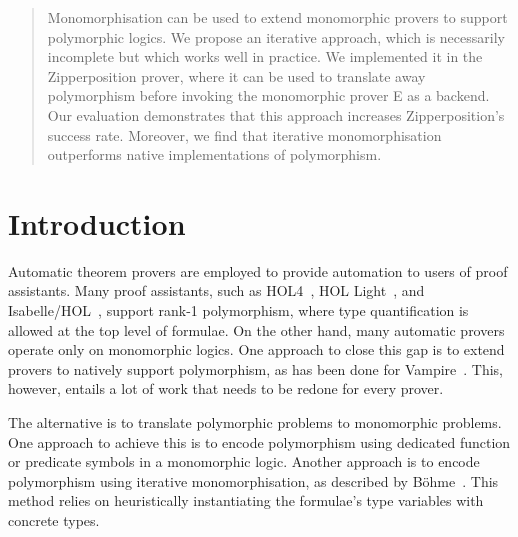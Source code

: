 \documentclass[runningheads]{llncs}
\begin{document}
\author{Tanguy Bozec \and
Jasmin Blanchette}




\maketitle

\begin{sloppy}
\begin{abstract}
Monomorphisation can be used to extend monomorphic provers to support polymorphic logics. We propose an iterative approach, which is necessarily incomplete but which works well in practice. We implemented it in the Zipperposition prover, where it can be used to translate away polymorphism before invoking the monomorphic prover E as a backend. Our evaluation demonstrates that this approach increases Zipperposition's success rate. Moreover, we find that iterative monomorphisation outperforms native implementations of polymorphism.

\end{abstract}
\end{sloppy}

\section{Introduction}

Automatic theorem provers are employed to provide automation to users of proof assistants. Many proof assistants, such as HOL4~\cite{slind-norrish-2008}, HOL Light~\cite{harrison-2009}, and Isabelle/HOL~\cite{nipkow-et-al-2002}, support rank-1 polymorphism, where type quantification is allowed at the top level of formulae. On the other hand, many automatic provers operate only on monomorphic logics. One approach to close this gap is to extend provers to natively support polymorphism, as has been done for Vampire~\cite{bhayat-reger-2020}. This, however, entails a lot of work that needs to be redone for every prover.

The alternative is to translate polymorphic problems to monomorphic problems.
One approach \cite[Section~9]{mono-trans} to achieve this is to encode polymorphism using dedicated function or predicate symbols in a monomorphic logic. Another approach is to encode polymorphism using {iterative monomorphisation}, as described by B\"ohme~\cite[Section 2.2.1]{sb-phd}. This method relies on heuristically instantiating the formulae's type variables with concrete types.
\end{document}
